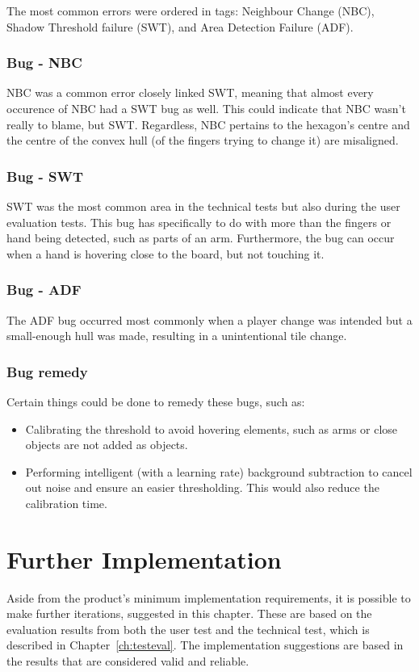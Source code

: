 The most common errors were ordered in tags: Neighbour Change (NBC), Shadow Threshold failure (SWT), and Area Detection Failure (ADF). 
\subsubsection*{Bug - NBC} 
NBC was a common error closely linked SWT, meaning that almost every occurence of NBC had a SWT bug as well. This could indicate that NBC wasn't really to blame, but SWT. Regardless, NBC pertains to the hexagon's centre and the centre of the convex hull (of the fingers trying to change it) are misaligned.
\subsubsection*{Bug - SWT} 
SWT was the most common area in the technical tests but also during the user evaluation tests. This bug has specifically to do with more than the fingers or hand being detected, such as parts of an arm. Furthermore, the bug can occur when a hand is hovering close to the board, but not touching it.
\subsubsection*{Bug - ADF} 
The ADF bug occurred most commonly when a player change was intended but a small-enough hull was made, resulting in a unintentional tile change.
\subsubsection*{Bug remedy}
Certain things could be done to remedy these bugs, such as:
\begin{itemize}
	\item Calibrating the threshold to avoid hovering elements, such as arms or close objects are not added as objects.
	\item Performing intelligent (with a learning rate) background subtraction to cancel out noise and ensure an easier thresholding. This would also reduce the calibration time.
\end{itemize}

\section{Further Implementation}
Aside from the product's minimum implementation requirements, it is possible to make further iterations, suggested in this chapter. These are based on the evaluation results from both the user test and the technical test, which is described in Chapter~\ref{ch:testeval}. The implementation suggestions are based in the results that are considered valid and reliable.

